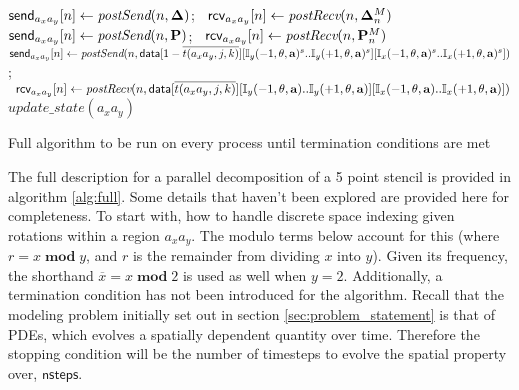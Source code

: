 \begin{algorithm}[h]
{{{{{{                          $\textsf{send}_{a_xa_y}[n] \leftarrow \textit{postSend}(n,\mathbf{\Delta})$;
                          $\;\;\textsf{rcv}_{a_xa_y}[n] \leftarrow \textit{postRecv}(n,\mathbf{\Delta}^M_n)$\;
                          $\textsf{send}_{a_xa_y}[n] \leftarrow \textit{postSend}(n,\mathbf{P})$;
                          $\;\;\textsf{rcv}_{a_xa_y}[n] \leftarrow \textit{postRecv}(n,\mathbf{P}^M_n)$\;
                          $\textsf{send}_{a_xa_y}[n] \leftarrow \textit{postSend}(n,\textup{\textsf{data}}[1-\overline{t(a_xa_y,j,k)}]
                          [\mathbb{I}_y(-1, \theta,\mathbf{a})^s..\mathbb{I}_y(+1, \theta,\mathbf{a})^s]
                          [\mathbb{I}_x(-1, \theta,\mathbf{a})^s..\mathbb{I}_x(+1, \theta,\mathbf{a})^s])$;
                          $\;\;\textsf{rcv}_{a_xa_y}[n] \leftarrow \textit{postRecv}(n,\textup{\textsf{data}}[\overline{t(a_xa_y,j,k)}]
                          [\mathbb{I}_y(-1, \theta,\mathbf{a})..\mathbb{I}_y(+1, \theta,\mathbf{a})]
                          [\mathbb{I}_x(-1, \theta,\mathbf{a})..\mathbb{I}_x(+1, \theta,\mathbf{a})])$\;
                      }
                  }
              }
              $update\_state(a_xa_y)$\;
          }
      }
  }
  \caption{Full algorithm to be run on every process until termination conditions are met}
  \label{alg:full}
\end{algorithm}

The full description for a parallel decomposition of a 5 point stencil
is provided in algorithm \ref{alg:full}.  Some details that haven't been
explored are provided here for completeness.
To start with, how to handle discrete space indexing given rotations
within a region $a_xa_y$.  The modulo terms below account for this (where
$r = x \;\mathbf{mod}\; y$, and $r$ is the remainder from dividing
$x$ into $y$).  Given its frequency, the shorthand
 $\overline{x} = x \;\mathbf{mod}\; 2$ is used as well when $y=2$.
Additionally, a termination condition has not been introduced for the
algorithm.  Recall that the modeling problem initially set out in section
\ref{sec:problem_statement} is that of PDEs, which evolves a spatially dependent
quantity over time.  Therefore the stopping condition will be the number of
timesteps to evolve the spatial property over, $\textsf{nsteps}$.

